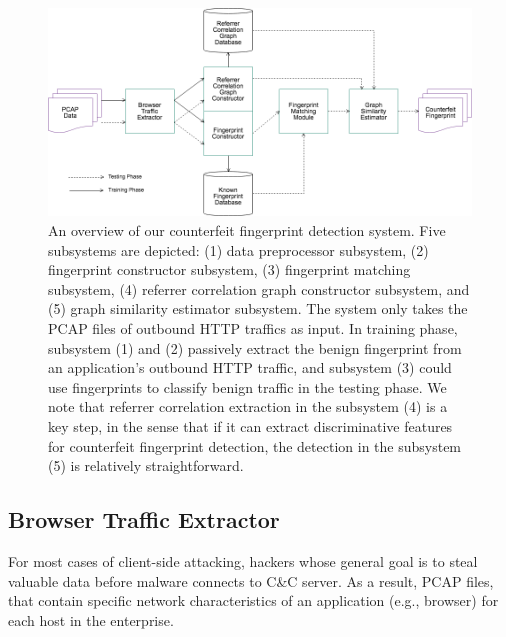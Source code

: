 \begin{figure}[!t]
\centering
\includegraphics[width=400pt]{image/sa.png}
\caption{An overview of our counterfeit fingerprint detection system. Five subsystems are depicted: (1) data preprocessor subsystem, (2) fingerprint constructor subsystem, (3) fingerprint matching subsystem, (4) referrer correlation graph constructor subsystem, and (5) graph similarity estimator subsystem. The system only takes the PCAP files of outbound HTTP traffics as input. In training phase, subsystem (1) and (2) passively extract the benign fingerprint from an application's outbound HTTP traffic, and subsystem (3) could use fingerprints to classify benign traffic in the testing phase. We note that referrer correlation extraction in the subsystem (4) is a key step, in the sense that if it can extract discriminative features for counterfeit fingerprint detection, the detection in the subsystem (5) is relatively straightforward.}
\label{fig:sa}
\end{figure}

\subsection{Browser Traffic Extractor}

For most cases of client-side attacking, hackers whose general goal is to steal valuable data before malware connects to C\&C server. As a result, PCAP files, that contain specific network characteristics of an application (e.g., browser) for each host in the enterprise. 


